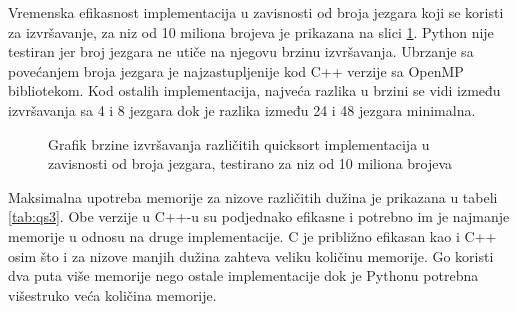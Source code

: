 \documentclass[12pt,oneside]{memoir}
\begin{document}
Vremenska efikasnost implementacija u zavisnosti od broja jezgara koji se koristi za izvršavanje, za niz od 10 miliona brojeva je prikazana na slici \ref{fig:qs1}. Python nije testiran jer broj jezgara ne utiče na njegovu brzinu izvršavanja. Ubrzanje sa povećanjem broja jezgara je najzastupljenije kod C++ verzije sa OpenMP bibliotekom. Kod ostalih implementacija, najveća razlika u brzini se vidi između izvršavanja sa 4 i 8 jezgara dok je razlika između 24 i 48 jezgara minimalna. 
\begin{figure}
\begin{center}


\caption{Grafik brzine izvršavanja različitih quicksort implementacija u zavisnosti od broja jezgara, testirano za niz od 10 miliona brojeva}
\label{fig:qs1}
\end{center}
\end{figure}

Maksimalna upotreba memorije za nizove različitih dužina je prikazana u tabeli \ref{tab:qs3}. Obe verzije u C++-u su podjednako efikasne i potrebno im je najmanje memorije u odnosu na druge implementacije. C je približno efikasan kao i C++ osim što i za nizove manjih dužina zahteva veliku količinu memorije. Go koristi dva puta više memorije nego ostale implementacije dok je Pythonu potrebna višestruko veća količina memorije.
\end{document}
